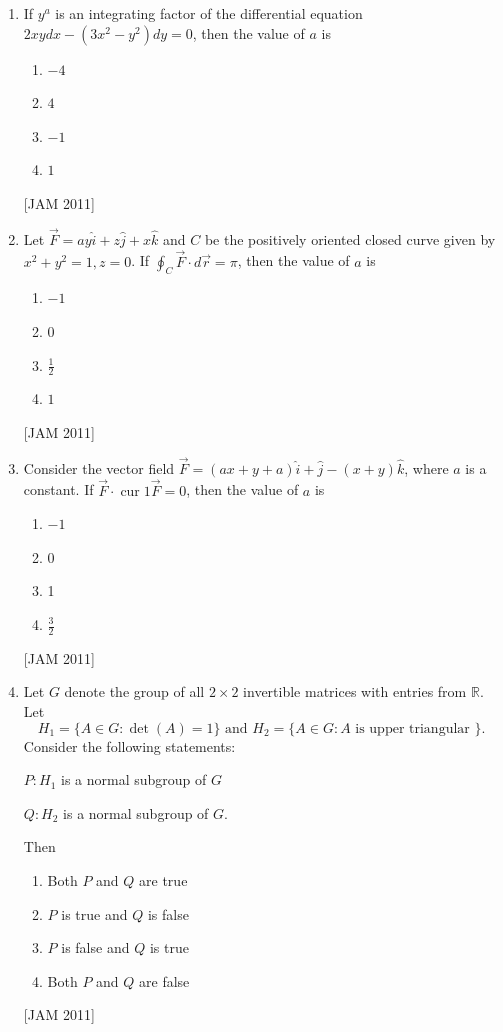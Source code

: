 \begin{enumerate}
\item  If $y^{a}$ is an integrating factor of the differential equation $2 x y d x-\left(3 x^{2}-y^{2}\right) d y=0$, then the value of $a$ is 
\begin{enumerate}
    \item $-4$ 
\item $4$ 
\item $-1$ 
\item $1$

\end{enumerate}
\hfill [JAM 2011]



\item  Let $\vec{F}=a y \hat{i}+z \hat{j}+x \hat{k}$ and $C$ be the positively oriented closed curve given by $x^{2}+y^{2}=1, z=0$. If $\oint_{C} \vec{F} \cdot d \vec{r}=\pi$, then the value of $a$ is 
\begin{enumerate}
    \item $-1$ 
\item $0$ 
\item $\frac{1}{2}$ 
\item $1$
\end{enumerate}
\hfill [JAM 2011]




\item  Consider the vector field $\vec{F}=(a x+y+a) \hat{i}+\hat{j}-(x+y) \hat{k}$, where $a$ is a constant. If $\vec{F} \cdot \operatorname{cur} 1 \vec{F}=0$, then the value of $a$ is 
\begin{enumerate}
    \item $-1$ 
\item 0 
\item 1 
\item $\frac{3}{2}$
\end{enumerate}
\hfill [JAM 2011]


 \item  Let $G$ denote the group of all $2 \times 2$ invertible matrices with entries from $\mathbb{R}$. Let
$$
H_{1}=\{A \in G: \operatorname{det}(A)=1\} \text { and } H_{2}=\{A \in G: A \text { is upper triangular }\} \text {. }
$$
Consider the following statements:

$P: H_{1}$ is a normal subgroup of $G$

$Q: H_{2}$ is a normal subgroup of $G$.

Then
\begin{enumerate}
    \item Both $P$ and $Q$ are true 
\item $P$ is true and $Q$ is false 
\item $P$ is false and $Q$ is true 
\item Both $P$ and $Q$ are false
\end{enumerate}
\hfill [JAM 2011]


\end{enumerate}
